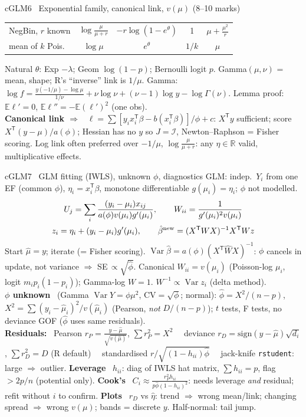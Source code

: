 \documentclass{article}
\newcommand{\h}[1]{{\bfseries #1}\ }
\newcommand{\E}{\mathbb E}
\newcommand{\V}{\operatorname{Var}}
\newcommand{\I}{\mathcal I}
\newcommand{\tsp}{^{\mathsf T}}
\newcommand{\rc}[1]{\texttt{#1}}
\newcommand{\sep}{\ \textbullet\ }
\begin{document}
\begin{multicols*}{3}
\begin{tb}{cGLM}{6 \textbullet\ Exponential family, canonical link, $v(\mu)$ (8--10 marks)}
\begin{tabularx}{\linewidth}{@{}L|c|c|c|c@{}}
NegBin, $r$ known & $\log\frac{\mu}{\mu+r}$ & $-r\log(1-e^\theta)$ & 1 & $\mu+\frac{\mu^2}r$\\
mean of $k$ Pois.\ & $\log\mu$ & $e^\theta$ & $1/k$ & $\mu$\\
\end{tabularx}
Natural $\theta$: Exp $-\lambda$; Geom $\log(1-p)$; Bernoulli logit $p$. Gamma$(\mu,\nu)$ = mean, shape; R's ``inverse'' link is $1/\mu$. Gamma: $\log f=\frac{y(-1/\mu)-\log\mu}{1/\nu}+\nu\log\nu+(\nu-1)\log y-\log\Gamma(\nu)$. Lemma proof: $\E\ell'=0$, $\E\ell''=-\E(\ell')^2$ (one obs).\\
\h{Canonical link $\Rightarrow$} $\ell=\sum[y_ix_i\tsp\beta-b(x_i\tsp\beta)]/\phi+c$: $X\tsp y$ sufficient; score $X\tsp(y-\mu)/a(\phi)$; Hessian has no $y$ so $J=\I$, Newton--Raphson = Fisher scoring. Log link often preferred over $-1/\mu$, $\log\frac{\mu}{\mu+r}$: any $\eta\in\mathbb R$ valid, multiplicative effects.
\end{tb}

\begin{tb}{cGLM}{7 \textbullet\ GLM fitting (IWLS), unknown $\phi$, diagnostics}
GLM: indep.\ $Y_i$ from one EF (common $\phi$), $\eta_i=x_i\tsp\beta$, monotone differentiable $g(\mu_i)=\eta_i$; $\phi$ not modelled.
\[\begin{gathered}U_j=\sum_i\frac{(y_i-\mu_i)x_{ij}}{a(\phi)v(\mu_i)g'(\mu_i)},\qquad W_{ii}=\frac1{g'(\mu_i)^2v(\mu_i)}\\ z_i=\eta_i+(y_i-\mu_i)g'(\mu_i),\qquad \hat\beta^{\rm new}=(X\tsp WX)^{-1}X\tsp Wz\end{gathered}\]
Start $\hat\mu=y$; iterate (= Fisher scoring). $\V\hat\beta=a(\phi)(X\tsp\hat WX)^{-1}$: $\phi$ cancels in update, not variance $\Rightarrow$ SE$\,\propto\sqrt{\hat\phi}$. Canonical $W_{ii}=v(\mu_i)$ (Poisson-log $\mu_i$, logit $m_ip_i(1-p_i)$); Gamma-log $W=1$. $W^{-1}\propto\V z_i$ (delta method).\\
\h{$\phi$ unknown} (Gamma $\V Y=\phi\mu^2$, CV$=\sqrt\phi$; normal): $\hat\phi=X^2/(n-p)$, $X^2=\sum(y_i-\hat\mu_i)^2/v(\hat\mu_i)$ (Pearson, \emph{not} $D/(n-p)$); $t$ tests, F tests, no deviance GOF ($\hat\phi$ uses same residuals).\\
\h{Residuals:} Pearson $r_P=\frac{y-\hat\mu}{\sqrt{v(\hat\mu)}}$, $\sum r_P^2=X^2$ \sep deviance $r_D=\text{sign}(y-\hat\mu)\sqrt{d_i}$, $\sum r_D^2=D$ (R default) \sep standardised $r/\sqrt{(1-h_{ii})\hat\phi}$ \sep jack-knife \rc{rstudent}: large $\Rightarrow$ outlier. \h{Leverage} $h_{ii}$: diag of IWLS hat matrix, $\sum h_{ii}=p$, flag $>2p/n$ (potential only). \h{Cook's} $C_i\approx\frac{r_P^2h_{ii}}{p\hat\phi(1-h_{ii})^2}$: needs leverage \emph{and} residual; refit without $i$ to confirm. \h{Plots} $r_D$ vs $\hat\eta$: trend $\Rightarrow$ wrong mean/link; changing spread $\Rightarrow$ wrong $v(\mu)$; bands = discrete $y$. Half-normal: tail jump.
\end{tb}


\end{multicols*}
\end{document}
